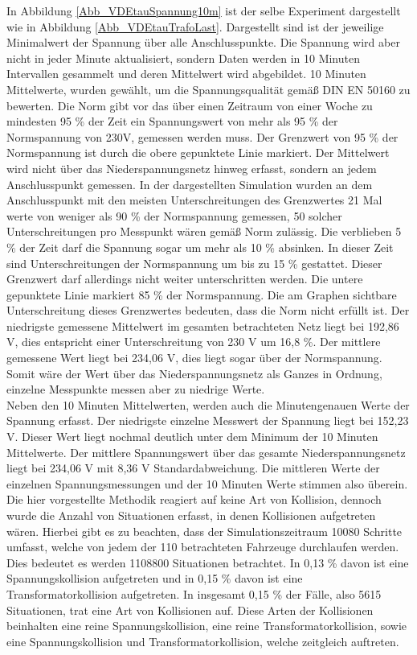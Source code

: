 In Abbildung \ref{Abb_VDEtauSpannung10m} ist der selbe Experiment dargestellt wie in Abbildung \ref{Abb_VDEtauTrafoLast}. Dargestellt sind ist der jeweilige Minimalwert der Spannung über alle Anschlusspunkte. Die Spannung wird aber nicht in jeder Minute aktualisiert, sondern Daten werden in 10 Minuten Intervallen gesammelt und deren Mittelwert wird abgebildet. 10 Minuten Mittelwerte, wurden gewählt, um die Spannungsqualität gemäß DIN EN 50160 zu bewerten. Die Norm gibt vor das über einen Zeitraum von einer Woche zu mindesten 95 \% der Zeit ein Spannungswert von mehr als 95 \% der Normspannung von 230V, gemessen werden muss. Der Grenzwert von 95 \% der Normspannung ist durch die obere gepunktete Linie markiert. Der Mittelwert wird nicht über das Niederspannungsnetz hinweg erfasst, sondern an jedem Anschlusspunkt gemessen. In der dargestellten Simulation wurden an dem Anschlusspunkt mit den meisten Unterschreitungen des Grenzwertes 21 Mal werte von weniger als 90 \% der Normspannung gemessen, 50 solcher Unterschreitungen pro Messpunkt wären gemäß Norm zulässig.
Die verblieben 5 \% der Zeit darf die Spannung sogar um mehr als 10 \% absinken. In dieser Zeit sind Unterschreitungen der Normspannung um bis zu 15 \% gestattet. Dieser Grenzwert darf allerdings nicht weiter unterschritten werden. Die untere gepunktete Linie markiert 85 \% der Normspannung. Die am Graphen sichtbare Unterschreitung dieses Grenzwertes bedeuten, dass die Norm nicht erfüllt ist. Der niedrigste gemessene Mittelwert im gesamten betrachteten Netz liegt bei 192,86 V, dies entspricht einer Unterschreitung von 230 V um 16,8 \%. Der mittlere gemessene Wert liegt bei 234,06 V, dies liegt sogar über der Normspannung. Somit wäre der Wert über das Niederspannungsnetz als Ganzes in Ordnung, einzelne Messpunkte messen aber zu niedrige Werte. \\
Neben den 10 Minuten Mittelwerten, werden auch die Minutengenauen Werte der Spannung erfasst. Der niedrigste einzelne Messwert der Spannung liegt bei 152,23 V.  Dieser Wert liegt nochmal deutlich unter dem Minimum der 10 Minuten Mittelwerte. Der mittlere Spannungswert über das gesamte Niederspannungsnetz liegt bei 234,06 V mit 8,36 V Standardabweichung. Die mittleren Werte der einzelnen Spannungsmessungen und der 10 Minuten Werte stimmen also überein.\\
Die hier vorgestellte Methodik reagiert auf keine Art von Kollision, dennoch wurde die Anzahl von Situationen erfasst, in denen Kollisionen aufgetreten wären. Hierbei gibt es zu beachten, dass der Simulationszeitraum 10080 Schritte umfasst, welche von jedem der 110 betrachteten Fahrzeuge durchlaufen werden. Dies bedeutet es werden 1108800 Situationen betrachtet. In 0,13 \% davon ist eine Spannungskollision aufgetreten und in 0,15 \% davon ist eine Transformatorkollision aufgetreten. In insgesamt 0,15 \% der Fälle, also 5615 Situationen, trat eine Art von Kollisionen auf. Diese Arten der Kollisionen beinhalten eine reine Spannungskollision, eine reine Transformatorkollision, sowie eine Spannungskollision und Transformatorkollision, welche zeitgleich auftreten. \\
